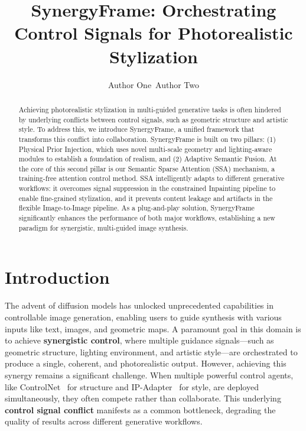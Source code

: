 \documentclass[letterpaper]{article} %
\begin{document}
\maketitle

\title{SynergyFrame: Orchestrating Control Signals for Photorealistic Stylization}
\author{
    Author One\
    Author Two
}

\begin{abstract}
Achieving photorealistic stylization in multi-guided generative tasks is often hindered by underlying conflicts between control signals, such as geometric structure and artistic style. To address this, we introduce SynergyFrame, a unified framework that transforms this conflict into collaboration. SynergyFrame is built on two pillars: (1) Physical Prior Injection, which uses novel multi-scale geometry and lighting-aware modules to establish a foundation of realism, and (2) Adaptive Semantic Fusion. At the core of this second pillar is our Semantic Sparse Attention (SSA) mechanism, a training-free attention control method. SSA intelligently adapts to different generative workflows: it overcomes signal suppression in the constrained Inpainting pipeline to enable fine-grained stylization, and it prevents content leakage and artifacts in the flexible Image-to-Image pipeline. As a plug-and-play solution, SynergyFrame significantly enhances the performance of both major workflows, establishing a new paradigm for synergistic, multi-guided image synthesis.
\end{abstract}


\section{Introduction}
\label{sec:introduction}

The advent of diffusion models has unlocked unprecedented capabilities in controllable image generation, enabling users to guide synthesis with various inputs like text, images, and geometric maps. A paramount goal in this domain is to achieve \textbf{synergistic control}, where multiple guidance signals—such as geometric structure, lighting environment, and artistic style—are orchestrated to produce a single, coherent, and photorealistic output. However, achieving this synergy remains a significant challenge. When multiple powerful control agents, like ControlNet~\cite{controlnet} for structure and IP-Adapter~\cite{ipadapter} for style, are deployed simultaneously, they often compete rather than collaborate. This underlying \textbf{control signal conflict} manifests as a common bottleneck, degrading the quality of results across different generative workflows.
\end{document}
